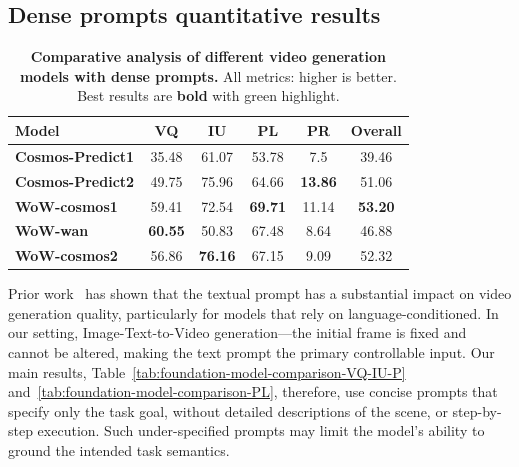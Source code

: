 
\subsection{Dense prompts quantitative results}
\begin{table}[!h]
\centering
\caption{\textbf{Comparative analysis of different video generation models with dense prompts.}
All metrics: higher is better. Best results are \textbf{bold} with green highlight.}
\label{tab:dense-comparison}
\setlength{\tabcolsep}{3pt} %
\begin{tabular}{lccccc}
\toprule
\textbf{Model} & \textbf{VQ} & \textbf{IU} & \textbf{PL} & \textbf{PR} & \textbf{Overall} \\
\midrule
\textbf{Cosmos-Predict1} & 35.48 & 61.07 & 53.78 & 7.5 & 39.46 \\
\textbf{Cosmos-Predict2} & 49.75 & 75.96 & 64.66 & \cellcolor{mylightgreen}\textbf{13.86} & 51.06 \\
\textbf{WoW-cosmos1} & 59.41 & 72.54 & \cellcolor{mylightgreen}\textbf{69.71} & 11.14 & \cellcolor{mylightgreen}\textbf{53.20} \\
\textbf{WoW-wan} & \cellcolor{mylightgreen}\textbf{60.55} & 50.83 & 67.48 & 8.64 & 46.88 \\
\textbf{WoW-cosmos2} & 56.86 & \cellcolor{mylightgreen}\textbf{76.16} & 67.15 & 9.09 & 52.32 \\
\bottomrule
\end{tabular}
\end{table}

Prior work~\cite{fan2025instancecap} has shown that the textual prompt has a substantial impact on video generation quality, particularly for models that rely on language-conditioned. In our setting, Image-Text-to-Video generation—the initial frame is fixed and cannot be altered, making the text prompt the primary controllable input. Our main results, Table~\ref{tab:foundation-model-comparison-VQ-IU-P} and~\ref{tab:foundation-model-comparison-PL}, therefore, use concise prompts that specify only the task goal, without detailed descriptions of the scene, or step-by-step execution. Such under-specified prompts may limit the model’s ability to ground the intended task semantics.

